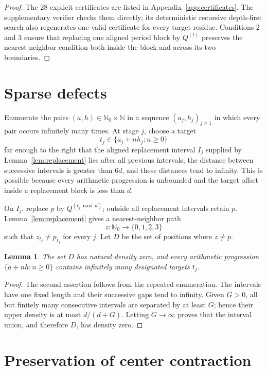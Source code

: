 \documentclass[11pt]{article}
\newtheorem{lemma}[theorem]{Lemma}
\newcommand{\N}{\mathbb N}
\begin{document}
\begin{proof}
The $28$ explicit certificates are listed in Appendix~\ref{app:certificates}.
The supplementary verifier checks them directly; its deterministic recursive
depth-first search also regenerates one valid certificate for every target
residue. Conditions 2 and 3 ensure that replacing one aligned period block by
$Q^{(t)}$ preserves the nearest-neighbor condition both inside the block and
across its two boundaries.
\end{proof}

\section{Sparse defects}

Enumerate the pairs $(a,h)\in\N_0\times\N$ in a sequence
$(a_j,h_j)_{j\ge1}$ in which every pair occurs infinitely many times. At
stage $j$, choose a target
\[
t_j\in\{a_j+n h_j:n\ge0\}
\]
far enough to the right that the aligned replacement interval $I_j$ supplied
by Lemma~\ref{lem:replacement} lies after all previous intervals, the distance
between successive intervals is greater than $6d$, and these distances tend
to infinity. This is possible because every arithmetic progression is
unbounded and the target offset inside a replacement block is less than $d$.

On $I_j$, replace $p$ by $Q^{(t_j\bmod d)}$; outside all replacement
intervals retain $p$. Lemma~\ref{lem:replacement} gives a nearest-neighbor
path
\[
z\colon\N_0\longrightarrow\{0,1,2,3\}
\]
such that $z_{t_j}\ne p_{t_j}$ for every $j$. Let $D$ be the set of
positions where $z\ne p$.

\begin{lemma}\label{lem:density}
The set $D$ has natural density zero, and every arithmetic progression
$\{a+nh:n\ge0\}$ contains infinitely many designated targets $t_j$.
\end{lemma}

\begin{proof}
The second assertion follows from the repeated enumeration. The intervals
have one fixed length and their successive gaps tend to infinity. Given
$G>0$, all but finitely many consecutive intervals are separated by at least
$G$; hence their upper density is at most $d/(d+G)$. Letting $G\to\infty$
proves that the interval union, and therefore $D$, has density zero.
\end{proof}

\section{Preservation of center contraction}
\end{document}
